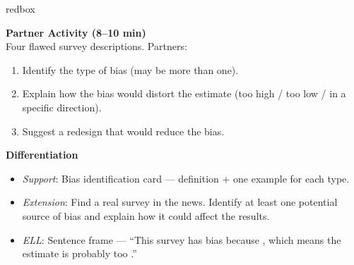 \documentclass[10pt]{article}
\begin{document}
\begin{skillbox}{redbox}
\begin{minipage}[t]{0.48\linewidth}
    \textbf{Partner Activity (8--10 min)}\\
    Four flawed survey descriptions. Partners:
    \begin{enumerate}
        \item Identify the type of bias (may be more than one).
        \item Explain how the bias would distort the estimate (too high / too low /
              in a specific direction).
        \item Suggest a redesign that would reduce the bias.
    \end{enumerate}
\end{minipage}
\hfill
\begin{minipage}[t]{0.48\linewidth}
    \textbf{Differentiation}
    \begin{itemize}
        \item \textit{Support}: Bias identification card --- definition + one example
              for each type.
        \item \textit{Extension}: Find a real survey in the news. Identify at least one
              potential source of bias and explain how it could affect the results.
        \item \textit{ELL}: Sentence frame --- ``This survey has \underline{\hspace{1cm}}
              bias because \underline{\hspace{2cm}}, which means the estimate is probably
              too \underline{\hspace{1cm}}.''
    \end{itemize}
\end{minipage}
\end{skillbox}
\end{document}
